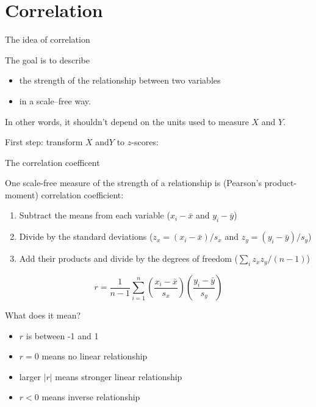 \section{Correlation}

\begin{frame}{The idea of correlation}

  The goal is to describe
  \begin{itemize}
    \item the strength of the relationship between two variables
    \item in a \alert{scale--free} way.
  \end{itemize}
  In other words, it shouldn't depend on the units used to measure $X$ and $Y$.

    \vspace{2em}

    First step: \alert{transform} $X$ and$Y$ to $z$-scores: \\

\end{frame}

\begin{frame}{The correlation coefficent}

  One scale-free measure of the strength of a relationship is (Pearson's product-moment) \alert{correlation coefficient}:
  \begin{enumerate}
    \item Subtract the means from each variable ($x_i-\bar x$ and $y_i-\bar y$)
    \item Divide by the standard deviations ($z_x=(x_i-\bar x)/s_x$ and $z_y=(y_i-\bar y)/s_y$)
    \item Add their products and divide by the degrees of freedom ($\sum_i z_x z_y / (n-1)$)
  \end{enumerate}
  \[
    r = \frac{1}{n-1} \sum_{i=1}^n \left(\frac{x_i-\bar x}{s_x}\right)\left(\frac{y_i-\bar y}{s_y}\right)
  \]

\end{frame}

\begin{frame}{What does it mean?}
  \begin{itemize}
    \item $r$ is between -1 and 1
    \item $r=0$ means no \alert{linear} relationship
    \item larger $|r|$ means stronger linear relationship
    \item $r<0$ means inverse relationship
  \end{itemize}

  \begin{center}
  \end{center}

\end{frame}


